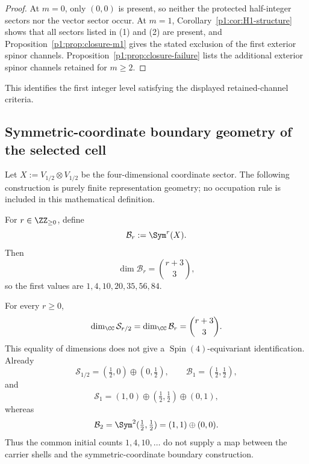 \documentclass[11pt]{article}
\begin{document}
\begin{proof}
At \(m=0\), only \((0,0)\) is present, so neither the protected half-integer sectors nor the vector sector occur. At \(m=1\), Corollary~\ref{p1:cor:H1-structure} shows that all sectors listed in (1) and (2) are present, and Proposition~\ref{p1:prop:closure-m1} gives the stated exclusion of the first exterior spinor channels. Proposition~\ref{p1:prop:closure-failure} lists the additional exterior spinor channels retained for \(m\ge 2\).
\end{proof}

\begin{remark}
This identifies the first integer level satisfying the displayed
retained-channel criteria.
\end{remark}

\subsection{Symmetric-coordinate boundary geometry of the selected cell}
\label{p1:subsec:symmetric-coordinate-boundary}

Let \(X:=V_{1/2}\otimes V_{1/2}\) be the four-dimensional coordinate sector.
The following construction is purely finite representation geometry; no
occupation rule is included in this mathematical definition.

\begin{definition}
\label{p1:def:raw-symmetric-coordinate-degree}
For \(r\in\ZZ_{\ge0}\), define
\[
  \mathcal B_r:=\Sym^r(X).
\]
Then
\[
  \dim\mathcal B_r=\binom{r+3}{3},
\]
so the first values are \(1,4,10,20,35,56,84\).
\end{definition}

\begin{proposition}
\label{p1:prop:shell-boundary-count-guard}
For every \(r\ge0\),
\[
    \dim_\CC\mathcal S_{r/2}
    =\dim_\CC\mathcal B_r
    =\binom{r+3}{3}.
\]
This equality of dimensions does not give a \(\operatorname{Spin}(4)\)-equivariant
identification.  Already
\[
    \mathcal S_{1/2}
    =(\tfrac12,0)\oplus(0,\tfrac12),
    \qquad
    \mathcal B_1=(\tfrac12,\tfrac12),
\]
and
\[
    \mathcal S_1=(1,0)\oplus(\tfrac12,\tfrac12)\oplus(0,1),
\]
whereas
\[
    \mathcal B_2=\Sym^2(\tfrac12,\tfrac12)
    =(1,1)\oplus(0,0).
\]
Thus the common initial counts \(1,4,10,\ldots\) do not supply a map between
the carrier shells and the symmetric-coordinate boundary construction.
\end{proposition}
\end{document}
